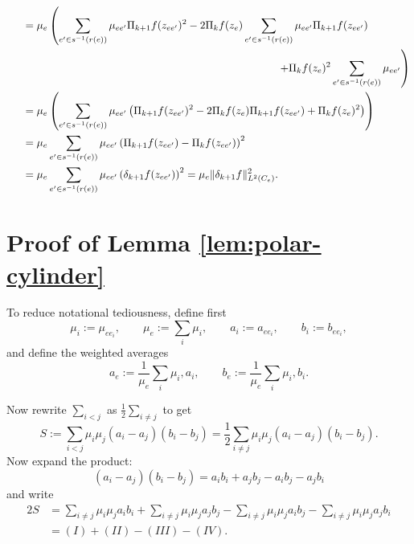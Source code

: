 \documentclass[12pt]{amsart}
\theoremstyle{plain}
\theoremstyle{definition}
\begin{document}
\begin{align*}
    &\hspace{.2in} = \mu_e \left(\sum_{e'\in s^{-1} (r(e))}\mu_{ee'} \Pi_{k+1}f(z_{ee'})^2 - 2\Pi_kf(z_e)\sum_{e'\in s^{-1} (r(e))}\mu_{ee'} \Pi_{k+1}f(z_{ee'}) \right. \\
    &\hspace{3.5in}\left. + \Pi_kf(z_e)^2 \sum_{e'\in s^{-1}(r(e))} \mu_{ee'} \right) \\
    &\hspace{.2in} = \mu_e \left(\sum_{e'\in s^{-1} (r(e))}\mu_{ee'} \left( \Pi_{k+1}f(z_{ee'})^2 - 2\Pi_kf(z_e) \Pi_{k+1}f(z_{ee'})  + \Pi_kf(z_e)^2 \right) \right)  \\
    &\hspace{.2in} = \mu_e \sum_{e'\in s^{-1} (r(e))}\mu_{ee'} \left( \Pi_{k+1}f(z_{ee'}) -  \Pi_kf(z_{ee'}) \right)^2   \\
    &\hspace{.2in} = \mu_e \sum_{e'\in s^{-1} (r(e))}\mu_{ee'} \left( \delta_{k+1}f(z_{ee'}) \right)^2    = \mu_e \|\delta_{k+1} f \|^2_{L^2(C_e)}.
\end{align*}
\section{Proof of Lemma \ref{lem:polar-cylinder}}
\label{app:B}
To reduce notational tediousness, define first
$$
\mu_i:=\mu_{ee_i},\qquad \mu_e:=\sum_i \mu_i,\qquad
a_i:=a_{ee_i},\qquad b_i:=b_{ee_i},
$$
and define the weighted averages
$$
a_e:=\frac{1}{\mu_e}\sum_i \mu_i,a_i,\qquad
b_e:=\frac{1}{\mu_e}\sum_i \mu_i,b_i.
$$

Now rewrite $\sum_{i<j}$ as $\tfrac12\sum_{i\neq j}$ to get
$$
S:=\sum_{i<j}\mu_i\mu_j(a_i-a_j)(b_i-b_j)
=\frac12\sum_{i\neq j}\mu_i\mu_j(a_i-a_j)(b_i-b_j).
$$
Now expand the product:
$$
(a_i-a_j)(b_i-b_j)=a_i b_i + a_j b_j - a_i b_j - a_j b_i
$$
and write
\begin{equation*}
\begin{split}
2S
&=\sum_{i\neq j}\mu_i\mu_j a_i b_i
+\sum_{i\neq j}\mu_i\mu_j a_j b_j
-\sum_{i\neq j}\mu_i\mu_j a_i b_j
-\sum_{i\neq j}\mu_i\mu_j a_j b_i \\
&= (I) + (II)- (III) - (IV).
\end{split}
\end{equation*}
\end{document}
